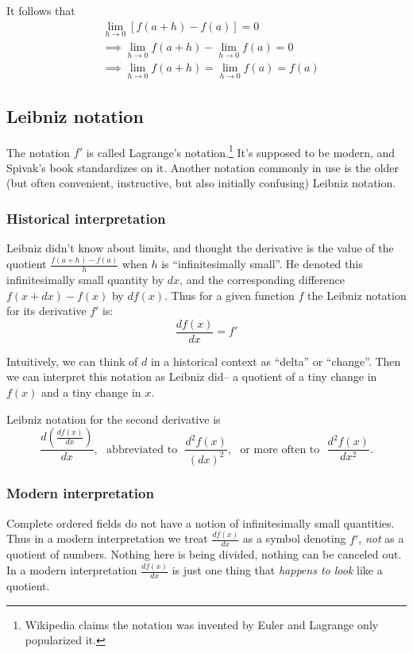 It follows that
\begin{align*}
  &\lim_{h\to0}[f(a+h)-f(a)]=0\\
  &\implies \lim_{h\to0}f(a+h)-\lim_{h\to0}f(a)=0\\
  &\implies \lim_{h\to0}f(a+h)=\lim_{h\to0}f(a)=f(a)
\end{align*}

\subsection{Leibniz notation}

The notation $f'$ is called Lagrange's notation.\footnote{Wikipedia
  claims the notation was invented by Euler and Lagrange only
  popularized it.} It's supposed to be modern, and Spivak's book
standardizes on it. Another notation commonly in use is the older (but
often convenient, instructive, but also initially confusing) Leibniz
notation.

\subsubsection*{Historical interpretation}

Leibniz didn't know about limits, and thought the derivative is the
value of the quotient $\frac{f(a+h)-f(a)}{h}$ when $h$ is
``infinitesimally small''. He denoted this infinitesimally small
quantity by $dx$, and the corresponding difference $f(x+dx)-f(x)$ by
$df(x)$. Thus for a given function $f$ the Leibniz notation for its
derivative $f'$ is:
\[\frac{df(x)}{dx}=f'\]

Intuitively, we can think of $d$ in a historical context as ``delta''
or ``change''. Then we can interpret this notation as Leibniz did-- a
quotient of a tiny change in $f(x)$ and a tiny change in $x$.

\vs

Leibniz notation for the second derivative is
\[\frac{d\left(\frac{df(x)}{dx}\right)}{dx},\ \ \ \text{abbreviated
    to}\ \ \ \frac{d^2f(x)}{(dx)^2}, \ \ \ \text{or more often to}\ \
  \ \frac{d^2f(x)}{dx^2}.\]

\subsubsection*{Modern interpretation}

Complete ordered fields do not have a notion of infinitesimally small
quantities. Thus in a modern interpretation we treat
$\frac{df(x)}{dx}$ as a symbol denoting $f'$, \textit{not} as a
quotient of numbers. Nothing here is being divided, nothing can be
canceled out. In a modern interpretation $\frac{df(x)}{dx}$ is just
one thing that \textit{happens to look} like a quotient.

